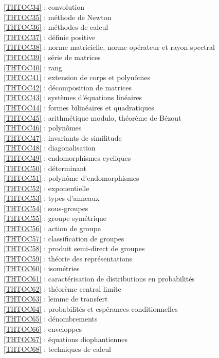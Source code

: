 \ref {THTOC34} : convolution\\
\ref {THTOC35} : méthode de Newton\\
\ref {THTOC36} : méthodes de calcul\\
\ref {THTOC37} : définie positive\\
\ref {THTOC38} : norme matricielle, norme opérateur et rayon spectral\\
\ref {THTOC39} : série de matrices\\
\ref {THTOC40} : rang\\
\ref {THTOC41} : extension de corps et polynômes\\
\ref {THTOC42} : décomposition de matrices\\
\ref {THTOC43} : systèmes d'équations linéaires\\
\ref {THTOC44} : formes bilinéaires et quadratiques\\
\ref {THTOC45} : arithmétique modulo, théorème de Bézout\\
\ref {THTOC46} : polynômes\\
\ref {THTOC47} : invariants de similitude\\
\ref {THTOC48} : diagonalisation\\
\ref {THTOC49} : endomorphismes cycliques\\
\ref {THTOC50} : déterminant\\
\ref {THTOC51} : polynôme d'endomorphismes\\
\ref {THTOC52} : exponentielle\\
\ref {THTOC53} : types d'anneaux\\
\ref {THTOC54} : sous-groupes\\
\ref {THTOC55} : groupe symétrique\\
\ref {THTOC56} : action de groupe\\
\ref {THTOC57} : classification de groupes\\
\ref {THTOC58} : produit semi-direct de groupes\\
\ref {THTOC59} : théorie des représentations\\
\ref {THTOC60} : isométries\\
\ref {THTOC61} : caractérisation de distributions en probabilités\\
\ref {THTOC62} : théorème central limite\\
\ref {THTOC63} : lemme de transfert\\
\ref {THTOC64} : probabilités et espérances conditionnelles\\
\ref {THTOC65} : dénombrements\\
\ref {THTOC66} : enveloppes\\
\ref {THTOC67} : équations diophantiennes\\
\ref {THTOC68} : techniques de calcul\\
